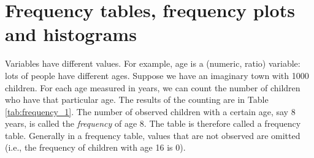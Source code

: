 \documentclass[]{book}\usepackage[]{graphicx}\usepackage[]{color}
\begin{document}
% 
% 
% 





\section{Frequency tables, frequency plots and histograms}

Variables have different values. For example, age is a (numeric, ratio) variable: lots of people have different ages. Suppose we have an imaginary town with 1000 children. For each age measured in years, we can count the number of children who have that particular age. The results of the counting are in Table \ref{tab:frequency_1}. The number of observed children with a certain age, say 8 years, is called the \textit{frequency} of age 8. The table is therefore called a frequency table. Generally in a frequency table, values that are not observed are omitted (i.e., the frequency of children with age 16 is 0).
\end{document}
